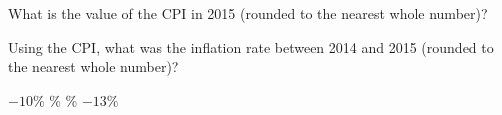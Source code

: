 \documentclass[addpoints,11pt]{exam}
\theoremstyle{definition}
\begin{document}
\begin{questions}
\question \label{q25} What is the value of the CPI in 2015 (rounded to the nearest whole number)?

\begin{choices}
\end{choices}


\question \label{q26} Using the CPI, what was the inflation rate between 2014 and 2015 (rounded to the nearest whole number)?

\begin{choices}
	\choice $-10\%$
	\%
	\%
	\choice $-13\%$
\end{choices}








\end{questions}
\end{document}

